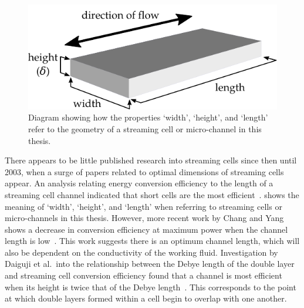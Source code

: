     \begin{figure}
      \centering
      \includegraphics{content/background/width_height_length}
      \caption{\label{fig:width_height_length}Diagram showing how the properties `width', `height', and `length' refer to the geometry of a streaming cell or micro-channel in this thesis.}
    \end{figure}

    There appears to be little published research into streaming cells since then until 2003, when a surge of papers related to optimal dimensions of streaming cells appear.
    An analysis relating energy conversion efficiency to the length of a streaming cell channel indicated that short cells are the most efficient~\cite{Yang2003}.
     shows the meaning of `width', `height', and `length' when referring to streaming cells or micro-channels in this thesis.
    However, more recent work by Chang and Yang shows a decrease in conversion efficiency at maximum power when the channel length is low~\cite{Chang2009}.
    This work suggests there is an optimum channel length, which will also be dependent on the conductivity of the working fluid.
    Investigation by Daiguji et al.\ into the relationship between the Debye length of the double layer and streaming cell conversion efficiency found that a channel is most efficient when its height is twice that of the Debye length~\cite{Daiguji2004}.
    This corresponds to the point at which double layers formed within a cell begin to overlap with one another.

